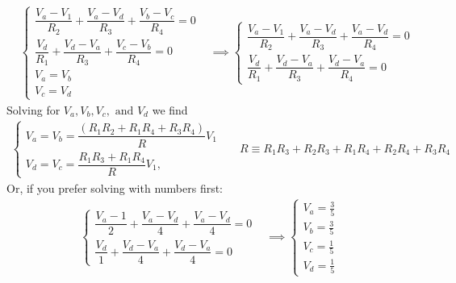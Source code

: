 \begin{enumerate}
{    \begin{align*}
    &\begin{cases*}
        \dfrac{V_a - V_1}{R_2} + \dfrac{V_a - V_d}{R_3} + \dfrac{V_b - V_c}{R_4} = 0 \\
    \dfrac{V_d}{R_1} + \dfrac{V_d - V_a}{R_3} + \dfrac{V_c - V_b}{R_4} = 0 \\
    V_a = V_b \\
    V_c = V_d 
    \end{cases*}
    &\implies
    \begin{cases*}
    \dfrac{V_a - V_1}{R_2} + \dfrac{V_a - V_d}{R_3} + \dfrac{V_a - V_d}{R_4} = 0 \\
    \dfrac{V_d}{R_1} + \dfrac{V_d - V_a}{R_3} + \dfrac{V_d - V_a}{R_4} = 0
    \end{cases*} 
    \end{align*}
    Solving for $V_a, V_b, V_c, \text{ and } V_d$ we find
    \begin{align*}
    \begin{cases*}
    V_a = V_b = \dfrac{(R_1 R_2 + R_1 R_4 + R_3 R_4)}{R} V_1\\
    V_d = V_c = \dfrac{R_1R_3 + R_1R_4}{R} V_1,
    \end{cases*}&&
    R \equiv R_1R_3+R_2R_3+R_1R_4+R_2R_4+R_3R_4
    \end{align*}
    Or, if you prefer solving with numbers first:
    \begin{align*}
        \begin{cases*}
        \dfrac{V_a - 1}{2} + \dfrac{V_a - V_d}{4} + \dfrac{V_a - V_d}{4} = 0 \\
        \dfrac{V_d}{1} + \dfrac{V_d - V_a}{4} + \dfrac{V_d - V_a}{4} = 0
        \end{cases*}
        &\implies
        \boxed{
        \begin{cases*}
        V_a = \frac{3}{5}\\
        V_b = \frac{3}{5}\\
        V_c = \frac{1}{5}\\
        V_d = \frac{1}{5}
        \end{cases*}}
    \end{align*}
}


\ans{
    \begin{center}
    \begin{circuitikz}[line width=0.5pt]
    

\end{circuitikz}
\end{center}}
\end{enumerate}
